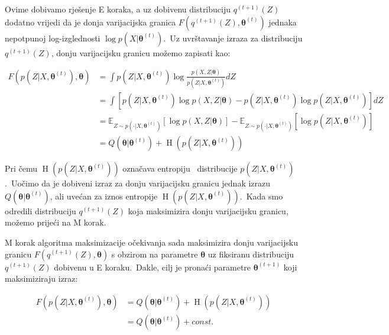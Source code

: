 \documentclass[diplomskirad]{fer}
\begin{document}
Ovime dobivamo rješenje E koraka, a uz dobivenu distribuciju $q^{(t + 1)}(Z)$ dodatno vrijedi da je donja varijacijska granica $F(q^{(t + 1)}(Z), \bm{\theta}^{(t)})$ jednaka nepotpunoj log-izglednosti $\log p(X | \bm{\theta}^{(t)})$.\ 
Uz uvrštavanje izraza za distribuciju $q^{(t + 1)}(Z)$, donju varijacijsku granicu možemo zapisati kao:

\begin{equation}
  \begin{aligned}
    F(p(Z | X, \bm{\theta}^{(t)}), \bm{\theta}) &= \int p(Z | X, \bm{\theta}^{(t)}) \log \frac{p(X, Z | \bm{\theta})}{p(Z | X, \bm{\theta}^{(t)})} dZ \\
                         &= \int \left[ p(Z | X, \bm{\theta}^{(t)}) \log p(X, Z | \bm{\theta}) - p(Z | X, \bm{\theta}^{(t)}) \log p(Z | X, \bm{\theta}^{(t)}) \right] dZ \\
                         &= \mathbb{E}_{Z \sim p(\cdot | X, \bm{\theta}^{(t)})} \left[ \log p(X, Z | \bm{\theta}) \right] - \mathbb{E}_{Z \sim p(\cdot | X, \bm{\theta}^{(t)})} \left[\log p(Z | X, \bm{\theta}^{(t)}) \right] \\
                         &= Q(\bm{\theta} | \bm{\theta}^{(t)}) + \operatorname{H}(p(Z | X, \bm{\theta}^{(t)}))
  \end{aligned}
  \label{eq:em_equality_of_e_step}
\end{equation}

Pri čemu $\operatorname{H}(p(Z | X, \bm{\theta}^{(t)}))$ označava entropiju~\cite{renyi1961measures} distribucije $p(Z | X, \bm{\theta}^{(t)})$.\ Uočimo da je dobiveni izraz za donju varijacijsku granicu jednak izrazu $Q(\bm{\theta} | \bm{\theta}^{(t)})$, ali uvećan za iznos entropije $\operatorname{H}(p(Z | X, \bm{\theta}^{(t)}))$.\ 
Kada smo odredili distribuciju $q^{(t + 1)}(Z)$ koja maksimizira donju varijacijsku granicu, možemo prijeći na M korak.\ 

M korak algoritma maksimizacije očekivanja sada maksimizira donju varijacijsku granicu $F(q^{(t + 1)}(Z), \bm{\theta})$ s obzirom na parametre $\bm{\theta}$ uz fiksiranu distribuciju $q^{(t + 1)}(Z)$ dobivenu u E koraku.\
Dakle, cilj je pronaći parametre $\bm{\theta}^{(t + 1)}$ koji maksimiziraju izraz:

\begin{equation}
  \begin{aligned}
    F(p(Z | X, \bm{\theta}^{(t)}), \bm{\theta}) &= Q(\bm{\theta} | \bm{\theta}^{(t)}) + \operatorname{H}(p(Z | X, \bm{\theta}^{(t)})) \\ 
                                                &= Q(\bm{\theta} | \bm{\theta}^{(t)}) + const. \\
  \end{aligned}
  \label{eq:em_m_step_general}
\end{equation}
\end{document}
